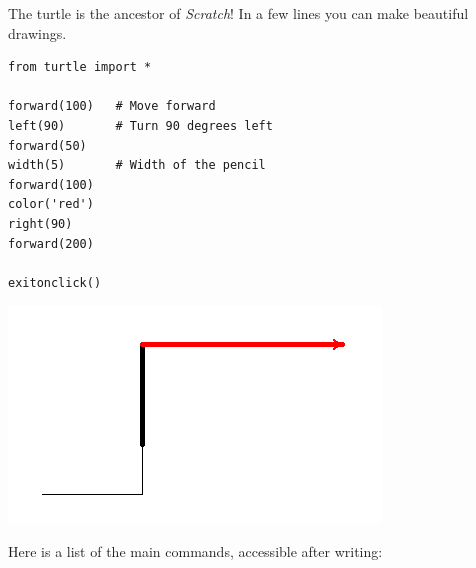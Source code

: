 \documentclass[11pt,class=report,crop=false]{standalone}
\begin{document}




\begin{cours}


The turtle is the ancestor of \emph{Scratch}! In a few lines you can make beautiful drawings.

\begin{lstlisting}
from turtle import *

forward(100)   # Move forward
left(90)       # Turn 90 degrees left
forward(50)
width(5)       # Width of the pencil
forward(100)
color('red')
right(90)
forward(200)

exitonclick()
\end{lstlisting}

\begin{center}
\includegraphics[scale=\myscale,scale=0.6]{screen-turtle-0}
\end{center}

Here is a list of the main commands, accessible after writing:


\end{cours}
\end{document}
